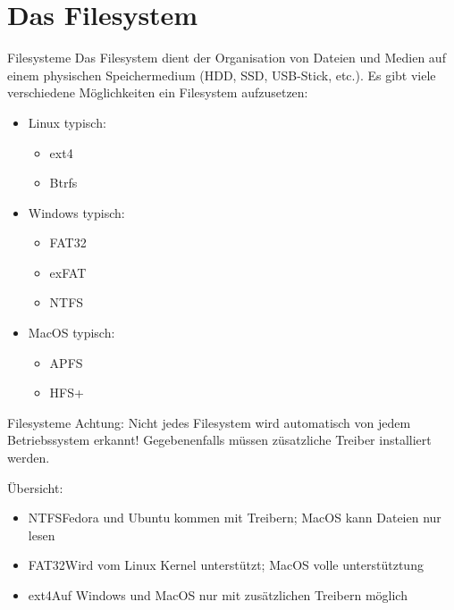 \documentclass{setbeamer}
\begin{document}
\section{Das Filesystem}

\begin{frame}{Filesysteme}
    Das Filesystem dient der Organisation von Dateien und Medien auf einem physischen Speichermedium (HDD, SSD, USB-Stick, etc.). Es gibt viele verschiedene Möglichkeiten ein Filesystem aufzusetzen:
    \begin{itemize}
        \pause
        \item Linux typisch:
        \begin{itemize}
            \item ext4
            \item Btrfs
        \end{itemize}

        \pause
        \item Windows typisch:
        \begin{itemize}
            \item FAT32 %
            \item exFAT
            \item NTFS
        \end{itemize}

        \pause
        \item MacOS typisch:
        \begin{itemize}
            \item APFS
            \item HFS+
        \end{itemize}
    \end{itemize}
\end{frame}

\begin{frame}{Filesysteme}
    Achtung: Nicht jedes Filesystem wird automatisch von jedem Betriebssystem erkannt! Gegebenenfalls müssen züsatzliche Treiber installiert werden.

    \vspace{0.3cm}

    Übersicht:
    \begin{itemize}
        \item NTFS\textemdash Fedora und Ubuntu kommen mit Treibern; MacOS kann Dateien nur lesen
        \item FAT32\textemdash Wird vom Linux Kernel unterstützt; MacOS volle unterstütztung
        \item ext4\textemdash Auf Windows und MacOS nur mit zusätzlichen Treibern möglich
    \end{itemize}
\end{frame}
\end{document}
